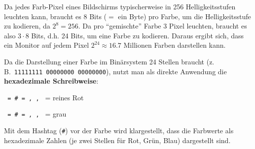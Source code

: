 \begin{myexample}
Da jedes Farb-Pixel eines Bildschirms typischerweise in 256 Helligkeitsstufen leuchten kann, braucht es 8 Bits ($=$ ein Byte) pro Farbe, um die Helligkeitsstufe zu kodieren, da $2^8=256$. Da pro \enquote{gemischte} Farbe 3 Pixel leuchten, braucht es also $3\cdot 8$ Bits, d.h. 24 Bits, um eine Farbe zu kodieren. Daraus ergibt sich, dass ein Monitor auf jedem Pixel $2^{24} \approx 16.7$ Millionen Farben darstellen kann.
\end{myexample}

\begin{myexample}
Da die Darstellung einer Farbe im Binärsystem 24 Stellen braucht (z.\,B.\ \texttt{11111111\,00000000\,00000000}), nutzt man als direkte Anwendung die \textbf{hexadezimale Schreibweise}:

\texttt{ = \# = , , } = reines Rot

\texttt{ = \# = , , } = grau

Mit dem Hashtag (\texttt{\#}) vor der Farbe wird klargestellt, dass die Farbwerte als hexadezimale Zahlen (je zwei Stellen für Rot, Grün, Blau) dargestellt sind.
\end{myexample}

